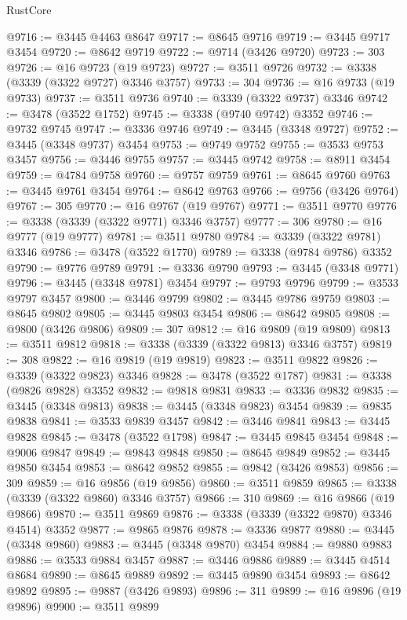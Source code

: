 \begin{lexlean}{RustCore}
\begin{coremodule}
@9716 := @3445 @4463 @8647
@9717 := @8645 @9716
@9719 := @3445 @9717 @3454
@9720 := @8642 @9719
@9722 := @9714 (@3426 @9720)
@9723 := 303
@9726 := @16 @9723 (@19 @9723)
@9727 := @3511 @9726
@9732 := @3338 (@3339 (@3322 @9727) @3346 @3757)
@9733 := 304
@9736 := @16 @9733 (@19 @9733)
@9737 := @3511 @9736
@9740 := @3339 (@3322 @9737) @3346
@9742 := @3478 (@3522 @1752)
@9745 := @3338 (@9740 @9742) @3352
@9746 := @9732 @9745
@9747 := @3336 @9746
@9749 := @3445 (@3348 @9727)
@9752 := @3445 (@3348 @9737) @3454
@9753 := @9749 @9752
@9755 := @3533 @9753 @3457
@9756 := @3446 @9755
@9757 := @3445 @9742
@9758 := @8911 @3454
@9759 := @4784 @9758
@9760 := @9757 @9759
@9761 := @8645 @9760
@9763 := @3445 @9761 @3454
@9764 := @8642 @9763
@9766 := @9756 (@3426 @9764)
@9767 := 305
@9770 := @16 @9767 (@19 @9767)
@9771 := @3511 @9770
@9776 := @3338 (@3339 (@3322 @9771) @3346 @3757)
@9777 := 306
@9780 := @16 @9777 (@19 @9777)
@9781 := @3511 @9780
@9784 := @3339 (@3322 @9781) @3346
@9786 := @3478 (@3522 @1770)
@9789 := @3338 (@9784 @9786) @3352
@9790 := @9776 @9789
@9791 := @3336 @9790
@9793 := @3445 (@3348 @9771)
@9796 := @3445 (@3348 @9781) @3454
@9797 := @9793 @9796
@9799 := @3533 @9797 @3457
@9800 := @3446 @9799
@9802 := @3445 @9786 @9759
@9803 := @8645 @9802
@9805 := @3445 @9803 @3454
@9806 := @8642 @9805
@9808 := @9800 (@3426 @9806)
@9809 := 307
@9812 := @16 @9809 (@19 @9809)
@9813 := @3511 @9812
@9818 := @3338 (@3339 (@3322 @9813) @3346 @3757)
@9819 := 308
@9822 := @16 @9819 (@19 @9819)
@9823 := @3511 @9822
@9826 := @3339 (@3322 @9823) @3346
@9828 := @3478 (@3522 @1787)
@9831 := @3338 (@9826 @9828) @3352
@9832 := @9818 @9831
@9833 := @3336 @9832
@9835 := @3445 (@3348 @9813)
@9838 := @3445 (@3348 @9823) @3454
@9839 := @9835 @9838
@9841 := @3533 @9839 @3457
@9842 := @3446 @9841
@9843 := @3445 @9828
@9845 := @3478 (@3522 @1798)
@9847 := @3445 @9845 @3454
@9848 := @9006 @9847
@9849 := @9843 @9848
@9850 := @8645 @9849
@9852 := @3445 @9850 @3454
@9853 := @8642 @9852
@9855 := @9842 (@3426 @9853)
@9856 := 309
@9859 := @16 @9856 (@19 @9856)
@9860 := @3511 @9859
@9865 := @3338 (@3339 (@3322 @9860) @3346 @3757)
@9866 := 310
@9869 := @16 @9866 (@19 @9866)
@9870 := @3511 @9869
@9876 := @3338 (@3339 (@3322 @9870) @3346 @4514) @3352
@9877 := @9865 @9876
@9878 := @3336 @9877
@9880 := @3445 (@3348 @9860)
@9883 := @3445 (@3348 @9870) @3454
@9884 := @9880 @9883
@9886 := @3533 @9884 @3457
@9887 := @3446 @9886
@9889 := @3445 @4514 @8684
@9890 := @8645 @9889
@9892 := @3445 @9890 @3454
@9893 := @8642 @9892
@9895 := @9887 (@3426 @9893)
@9896 := 311
@9899 := @16 @9896 (@19 @9896)
@9900 := @3511 @9899

\end{coremodule}
\end{lexlean}
